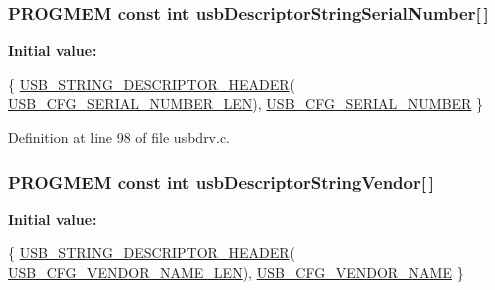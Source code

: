 \hypertarget{mhvlib-_vusb-_keyboard_2vusb_2usbdrv_8c_a97aa1ed300e711b6eabb5cef561313a3}{
\subsubsection[{usb\-Descriptor\-String\-Serial\-Number}]{\setlength{\rightskip}{0pt plus 5cm}P\-R\-O\-G\-M\-E\-M const int usb\-Descriptor\-String\-Serial\-Number\mbox{[}$\,$\mbox{]}}}\label{mhvlib-_vusb-_keyboard_2vusb_2usbdrv_8c_a97aa1ed300e711b6eabb5cef561313a3}
{\bfseries Initial value\-:}
\begin{DoxyCode}
 \{
    \hyperlink{mhvlib-_vusb-_keyboard_2vusb_2usbdrv_8h_ad94ebd3045d80d1e2ab32c22be4ff96e}{USB\_STRING\_DESCRIPTOR\_HEADER}(
      \hyperlink{mhvlib-_vusb-_keyboard_2vusb_2usbconfig_8h_a641423b56d832e5d8aff852390591aa0}{USB\_CFG\_SERIAL\_NUMBER\_LEN}),
    \hyperlink{mhvlib-_vusb-_keyboard_2vusb_2usbconfig_8h_a854f9931a43692546ac669ad8b7c4a98}{USB\_CFG\_SERIAL\_NUMBER}
\}
\end{DoxyCode}


Definition at line 98 of file usbdrv.\-c.

\hypertarget{mhvlib-_vusb-_keyboard_2vusb_2usbdrv_8c_aa92b0dfd57d302ff023bfb7ed868c2a1}{
\subsubsection[{usb\-Descriptor\-String\-Vendor}]{\setlength{\rightskip}{0pt plus 5cm}P\-R\-O\-G\-M\-E\-M const int usb\-Descriptor\-String\-Vendor\mbox{[}$\,$\mbox{]}}}\label{mhvlib-_vusb-_keyboard_2vusb_2usbdrv_8c_aa92b0dfd57d302ff023bfb7ed868c2a1}
{\bfseries Initial value\-:}
\begin{DoxyCode}
 \{
    \hyperlink{mhvlib-_vusb-_keyboard_2vusb_2usbdrv_8h_ad94ebd3045d80d1e2ab32c22be4ff96e}{USB\_STRING\_DESCRIPTOR\_HEADER}(
      \hyperlink{mhvlib-_vusb-_keyboard_2vusb_2usbconfig-prototype_8h_a3085d820d9dc6e939737a3f1b9a457d7}{USB\_CFG\_VENDOR\_NAME\_LEN}),
    \hyperlink{mhvlib-_vusb-_keyboard_2vusb_2usbconfig-prototype_8h_a25a2baf5c8feb0982a47050423add0ec}{USB\_CFG\_VENDOR\_NAME}
\}
\end{DoxyCode}


